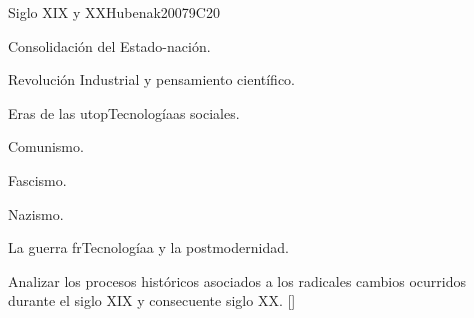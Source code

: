 \begin{syllabus}
\begin{unit}{}{Siglo XIX y XX}{Hubenak2007}{9}{C20}
\begin{topics}
	\item Consolidación del Estado-nación.
	\item Revolución Industrial y pensamiento científico.
	\item Eras de las utopTecnologíaas sociales.
	      \begin{subtopics}
		\item Comunismo.
		\item Fascismo.
		\item Nazismo.
	      \end{subtopics}
	\item La guerra frTecnologíaa y la postmodernidad.
\end{topics}
\begin{learningoutcomes}
	\item Analizar los procesos históricos asociados a los radicales cambios ocurridos durante el siglo XIX y consecuente siglo XX. [\Familiarity]
\end{learningoutcomes}
\end{unit}



\begin{coursebibliography}
\end{coursebibliography}

\end{syllabus}

